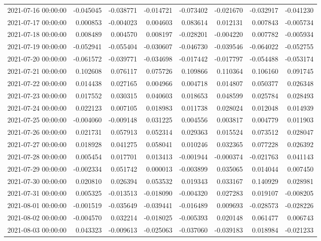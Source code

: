\begin{tabular}{lrrrrrrr}
2021-07-16 00:00:00 & -0.045045 & -0.038771 & -0.014721 & -0.073402 & -0.021670 & -0.032917 & -0.041230 \\
2021-07-17 00:00:00 & 0.000853 & -0.004023 & 0.004603 & 0.083614 & 0.012131 & 0.007843 & -0.005734 \\
2021-07-18 00:00:00 & 0.008489 & 0.004570 & 0.008197 & -0.028201 & -0.004220 & 0.007782 & -0.005934 \\
2021-07-19 00:00:00 & -0.052941 & -0.055404 & -0.030607 & -0.046730 & -0.039546 & -0.064022 & -0.052755 \\
2021-07-20 00:00:00 & -0.061572 & -0.039771 & -0.034698 & -0.017442 & -0.017797 & -0.054488 & -0.053174 \\
2021-07-21 00:00:00 & 0.102608 & 0.076117 & 0.075726 & 0.109866 & 0.110364 & 0.106160 & 0.091745 \\
2021-07-22 00:00:00 & 0.014438 & 0.027165 & 0.004966 & 0.004718 & 0.014807 & 0.050377 & 0.026348 \\
2021-07-23 00:00:00 & 0.017552 & 0.030315 & 0.040603 & 0.018653 & 0.048599 & 0.025784 & 0.028493 \\
2021-07-24 00:00:00 & 0.022123 & 0.007105 & 0.018983 & 0.011738 & 0.028024 & 0.012048 & 0.014939 \\
2021-07-25 00:00:00 & -0.004060 & -0.009148 & 0.031225 & 0.004556 & 0.003817 & 0.004779 & 0.011903 \\
2021-07-26 00:00:00 & 0.021731 & 0.057913 & 0.052314 & 0.029363 & 0.015524 & 0.073512 & 0.028047 \\
2021-07-27 00:00:00 & 0.018928 & 0.041275 & 0.058041 & 0.010246 & 0.032365 & 0.077228 & 0.026392 \\
2021-07-28 00:00:00 & 0.005454 & 0.017701 & 0.013413 & -0.001944 & -0.000374 & -0.021763 & 0.041143 \\
2021-07-29 00:00:00 & -0.002334 & 0.051742 & 0.000013 & -0.003899 & 0.035065 & 0.014044 & 0.007450 \\
2021-07-30 00:00:00 & 0.020810 & 0.026394 & 0.053532 & 0.019343 & 0.033167 & 0.140929 & 0.028981 \\
2021-07-31 00:00:00 & 0.005325 & -0.013513 & -0.018090 & -0.004320 & 0.027283 & 0.019107 & -0.008205 \\
2021-08-01 00:00:00 & -0.001519 & -0.035649 & -0.039441 & -0.016489 & 0.009693 & -0.028573 & -0.028226 \\
2021-08-02 00:00:00 & -0.004570 & 0.032214 & -0.018025 & -0.005393 & 0.020148 & 0.061477 & 0.006743 \\
2021-08-03 00:00:00 & 0.043323 & -0.009613 & -0.025063 & -0.037060 & -0.039183 & 0.018984 & -0.021233 \\

\end{tabular}
